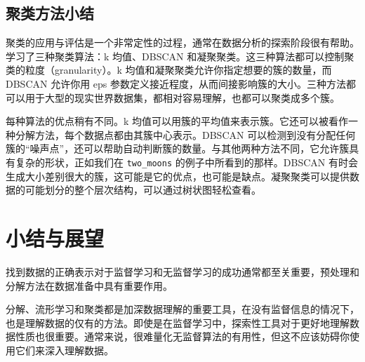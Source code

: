 \subsection{聚类方法小结}
聚类的应用与评估是一个非常定性的过程，通常在数据分析的探索阶段很有帮助。学习了三种聚类算法：k 均值、DBSCAN 和凝聚聚类。这三种算法都可以控制聚类的粒度（granularity）。k 均值和凝聚聚类允许你指定想要的簇的数量，而DBSCAN 允许你用 eps 参数定义接近程度，从而间接影响簇的大小。三种方法都可以用于大型的现实世界数据集，都相对容易理解，也都可以聚类成多个簇。

每种算法的优点稍有不同。k 均值可以用簇的平均值来表示簇。它还可以被看作一种分解方法，每个数据点都由其簇中心表示。DBSCAN 可以检测到没有分配任何簇的“噪声点”，还可以帮助自动判断簇的数量。与其他两种方法不同，它允许簇具有复杂的形状，正如我们在 \verb|two_moons| 的例子中所看到的那样。DBSCAN 有时会生成大小差别很大的簇，这可能是它的优点，也可能是缺点。凝聚聚类可以提供数据的可能划分的整个层次结构，可以通过树状图轻松查看。
\section{小结与展望}
找到数据的正确表示对于监督学习和无监督学习的成功通常都至关重要，预处理和分解方法在数据准备中具有重要作用。

分解、流形学习和聚类都是加深数据理解的重要工具，在没有监督信息的情况下，也是理解数据的仅有的方法。即使是在监督学习中，探索性工具对于更好地理解数据性质也很重要。通常来说，很难量化无监督算法的有用性，但这不应该妨碍你使用它们来深入理解数据。

